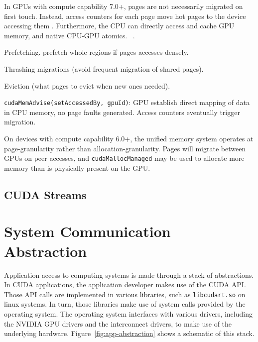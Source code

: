 In GPUs with compute capability 7.0+, pages are not necessarily migrated on first touch.
Instead, access counters for each page move hot pages to the device accessing them .
Furthermore, the CPU can directly access and cache GPU memory, and native CPU-GPU atomics. ~\cite{sakharnykh2017unified}.


Prefetching.
prefetch whole regions if pages accesses densely.

Thrashing migrations (avoid frequent migration of shared pages).

Eviction (what pages to evict when new ones needed).

\texttt{cudaMemAdvise(setAccessedBy, gpuId)}: GPU establish direct mapping of data in CPU memory, no page faults generated.
Access counters eventually trigger migration.





On devices with compute capability 6.0+, the unified memory system operates at page-granularity rather than allocation-granularity.
Pages will migrate between GPUs on peer accesses, and \texttt{cudaMallocManaged} may be used to allocate more memory than is physically present on the GPU.

\subsection{CUDA Streams}




\section{System Communication Abstraction}
\label{sec:sys-abstraction}




Application access to computing systems is made through a stack of abstractions.
In CUDA applications, the application developer makes use of the CUDA API.
Those API calls are implemented in various libraries, such as \texttt{libcudart.so} on linux systems.
In turn, those libraries make use of system calls provided by the operating system.
The operating system interfaces with various drivers, including the NVIDIA GPU drivers and the interconnect drivers, to make use of the underlying hardware.
Figure~\ref{fig:app-abstraction} shows a schematic of this stack.

